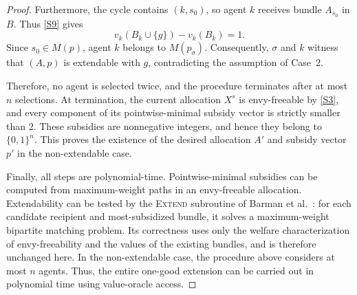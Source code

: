 \begin{proof}
Furthermore, the cycle contains $(k,s_0)$, so agent $k$ receives bundle $A_{s_0}$ in $B$. Thus \eqref{S9} gives
\[
v_k(B_k\cup\{g\})-v_k(B_k)=1.
\]
Since $s_0\in M(p)$, agent $k$ belongs to $M(p_\sigma)$. Consequently, $\sigma$ and $k$ witness that $(A,p)$ is extendable with $g$, contradicting the assumption of Case~2.

Therefore, no agent is selected twice, and the procedure terminates after at most $n$ selections. At termination, the current allocation $X^s$ is envy-freeable by \eqref{S3}, and every component of its pointwise-minimal subsidy vector is strictly smaller than $2$. These subsidies are nonnegative integers, and hence they belong to $\{0,1\}^n$. This proves the existence of the desired allocation $A'$ and subsidy vector $p'$ in the non-extendable case.

Finally, all steps are polynomial-time. Pointwise-minimal subsidies can be computed from maximum-weight paths in an envy-freeable allocation. Extendability can be tested by the \textsc{Extend} subroutine of Barman et al.~\cite{BKNS22}: for each candidate recipient and most-subsidized bundle, it solves a maximum-weight bipartite matching problem. Its correctness uses only the welfare characterization of envy-freeability and the values of the existing bundles, and is therefore unchanged here. In the non-extendable case, the procedure above considers at most $n$ agents. Thus, the entire one-good extension can be carried out in polynomial time using value-oracle access.
\end{proof}
